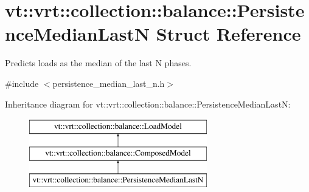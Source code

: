 \hypertarget{structvt_1_1vrt_1_1collection_1_1balance_1_1_persistence_median_last_n}{}\section{vt\+:\+:vrt\+:\+:collection\+:\+:balance\+:\+:Persistence\+Median\+LastN Struct Reference}
\label{structvt_1_1vrt_1_1collection_1_1balance_1_1_persistence_median_last_n}


Predicts loads as the median of the last N phases.  




{\ttfamily \#include $<$persistence\+\_\+median\+\_\+last\+\_\+n.\+h$>$}

Inheritance diagram for vt\+:\+:vrt\+:\+:collection\+:\+:balance\+:\+:Persistence\+Median\+LastN\+:\begin{figure}[H]
\begin{center}
\leavevmode
\includegraphics[height=3.000000cm]{structvt_1_1vrt_1_1collection_1_1balance_1_1_persistence_median_last_n}
\end{center}
\end{figure}
